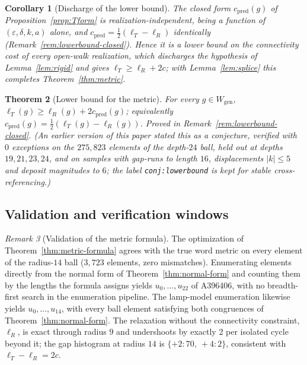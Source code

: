 \documentclass[11pt]{article}
\theoremstyle{plain}
\newtheorem{theorem}{Theorem}
\newtheorem{corollary}[theorem]{Corollary}
\theoremstyle{definition}
\theoremstyle{remark}
\newtheorem{remark}[theorem]{Remark}
\begin{document}
\begin{corollary}[Discharge of the lower bound]
\label{cor:rigid}
The closed form $c_{\mathrm{pred}}(g)$ of Proposition~\textup{\ref{prop:Tform}}
is realization-independent, being a function of $(\varepsilon,\delta,k,a)$
alone, and $c_{\mathrm{pred}}=\tfrac12(\ell_T-\ell_R)$ identically
(Remark~\textup{\ref{rem:lowerbound-closed}}). Hence it is a lower bound on
the connectivity cost of every open-walk realization, which discharges the
hypothesis of Lemma~\textup{\ref{lem:rigid}} and gives $\ell_T\ge\ell_R+2c$;
with Lemma~\textup{\ref{lem:splice}} this completes Theorem~\textup{\ref{thm:metric}}.
\end{corollary}

\begin{theorem}[Lower bound for the metric]
\label{conj:lowerbound}
For every $g\in W_{\mathrm{gen}}$, $\ell_T(g)\ge\ell_R(g)+2c_{\mathrm{pred}}(g)$;
equivalently $c_{\mathrm{pred}}(g)=\tfrac12(\ell_T(g)-\ell_R(g))$. Proved in
Remark~\textup{\ref{rem:lowerbound-closed}}. (An earlier version of this paper
stated this as a conjecture, verified with $0$ exceptions on the $275{,}823$
elements of the depth-$24$ ball, held out at depths $19,21,23,24$, and on
samples with gap-runs to length $16$, displacements $|k|\le5$ and deposit
magnitudes to $6$; the label \texttt{conj:lowerbound} is kept for stable
cross-referencing.)
\end{theorem}

\subsection{Validation and verification windows}

\begin{remark}[Validation of the metric formula]
\label{rem:validation}
The optimization of Theorem~\ref{thm:metric-formula} agrees with the true word
metric on every element of the radius-$14$ ball ($3{,}723$ elements, zero
mismatches). Enumerating elements directly from the normal form of
Theorem~\ref{thm:normal-form} and counting them by the lengths the formula
assigns yields $u_0,\dots,u_{22}$ of A396406, with no breadth-first search in
the enumeration pipeline. The lamp-model enumeration likewise yields
$u_0,\dots,u_{14}$, with every ball element satisfying both congruences of
Theorem~\ref{thm:normal-form}. The relaxation without the connectivity
constraint, $\ell_R$, is exact through radius $9$ and undershoots by exactly $2$
per isolated cycle beyond it; the gap histogram at radius $14$ is
$\{+2:70,\ +4:2\}$, consistent with $\ell_T-\ell_R=2c$.
\end{remark}
\end{document}
